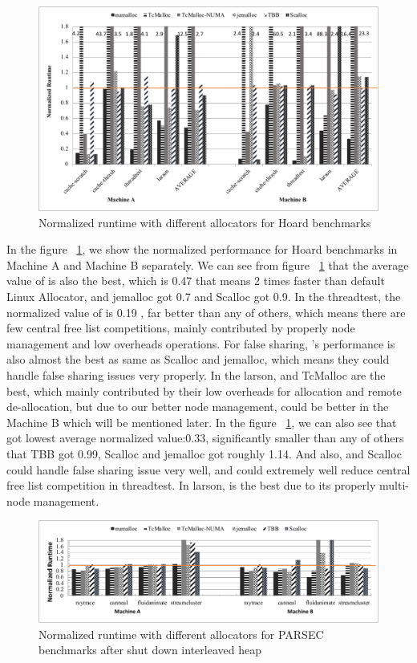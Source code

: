 \begin{figure}[H]
    \centering
    \includegraphics[width=\textwidth]{figure/hoard-perf.pdf}
    \caption{Normalized runtime with different allocators for Hoard benchmarks}
    \label{hoard-perf}
\end{figure}

In the figure ~\ref{hoard-perf}, we show the normalized performance for Hoard benchmarks in Machine A and Machine B separately. We can see from figure ~\ref{hoard-perf} that the average value of \NM{} is also the best, which is 0.47 that means 2 times faster than default Linux Allocator, and jemalloc got 0.7 and Scalloc got 0.9. In the threadtest, the normalized value of \NM{} is 0.19 , far better than any of others, which means there are few central free list competitions, mainly contributed by properly node management and low overheads operations. For false sharing, \NM{}'s performance is also almost the best as same as Scalloc and jemalloc, which means they could handle false sharing issues very properly. In the larson, \NM{} and TcMalloc are the best, which mainly contributed by their low overheads for allocation and remote de-allocation, but due to our better node management, \NM{} could be better in the Machine B which will be mentioned later. In the figure ~\ref{hoard-perf}, we can also see that \NM{} got lowest average normalized value:0.33, significantly smaller than any of others that TBB got 0.99, Scalloc and jemalloc got roughly 1.14. And also, \NM{} and Scalloc could handle false sharing issue very well, and \NM{} could extremely well reduce central free list competition in threadtest. In larson, \NM{} is the best due to its properly multi-node management. 
\begin{figure}[H]
    \centering
    \includegraphics[width=\textwidth]{figure/no-interleaved.pdf}
    \caption{Normalized runtime with different allocators for PARSEC benchmarks after shut down interleaved heap}
    \label{parsec-no-interleaved-perf}
\end{figure}

